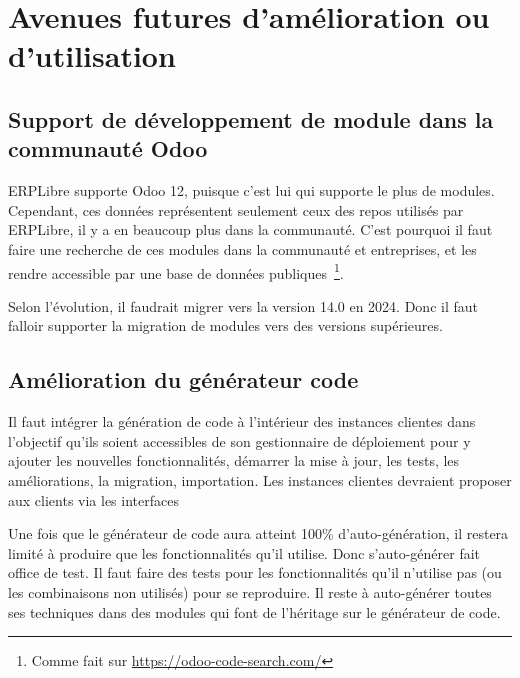 \section{Avenues futures d’amélioration ou d’utilisation}

\subsection{Support de développement de module dans la communauté Odoo}

ERPLibre supporte Odoo 12, puisque c’est lui qui supporte le plus de modules. Cependant, ces données représentent seulement ceux des repos utilisés par ERPLibre, il y a en beaucoup plus dans la communauté. C’est pourquoi il faut faire une recherche de ces modules dans la communauté et entreprises, et les rendre accessible par une base de données publiques~\footnote{Comme fait sur \url{https://odoo-code-search.com/}}.

Selon l’évolution, il faudrait migrer vers la version 14.0 en 2024. Donc il faut falloir supporter la migration de modules vers des versions supérieures.

\subsection{Amélioration du générateur code}

Il faut intégrer la génération de code à l’intérieur des instances clientes dans l’objectif qu’ils soient accessibles de son gestionnaire de déploiement pour y ajouter les nouvelles fonctionnalités, démarrer la mise à jour, les tests, les améliorations, la migration, importation. Les instances clientes devraient proposer aux clients via les interfaces 




Une fois que le générateur de code aura atteint 100\% d’auto-génération, il restera limité à produire que les fonctionnalités qu’il utilise. Donc s’auto-générer fait office de test. Il faut faire des tests pour les fonctionnalités qu’il n’utilise pas (ou les combinaisons non utilisés) pour se reproduire. Il reste à auto-générer toutes ses techniques dans des modules qui font de l'héritage sur le générateur de code.

